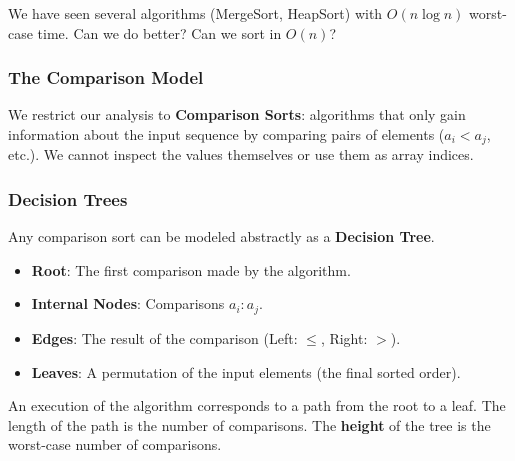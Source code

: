 \documentclass[12pt]{article}
\theoremstyle{blueplain}
\theoremstyle{bluedef}
\theoremstyle{blueremark}
\begin{document}
We have seen several algorithms (MergeSort, HeapSort) with $O(n \log n)$ worst-case time. Can we do better? Can we sort in $O(n)$?

\subsubsection{The Comparison Model}
We restrict our analysis to \textbf{Comparison Sorts}: algorithms that only gain information about the input sequence by comparing pairs of elements ($a_i < a_j$, etc.). We cannot inspect the values themselves or use them as array indices.

\subsubsection{Decision Trees}
Any comparison sort can be modeled abstractly as a \textbf{Decision Tree}.
\begin{itemize}
    \item \textbf{Root}: The first comparison made by the algorithm.
    \item \textbf{Internal Nodes}: Comparisons $a_i : a_j$.
    \item \textbf{Edges}: The result of the comparison (Left: $\le$, Right: $>$).
    \item \textbf{Leaves}: A permutation of the input elements (the final sorted order).
\end{itemize}
An execution of the algorithm corresponds to a path from the root to a leaf. The length of the path is the number of comparisons. The \textbf{height} of the tree is the worst-case number of comparisons.
\end{document}
